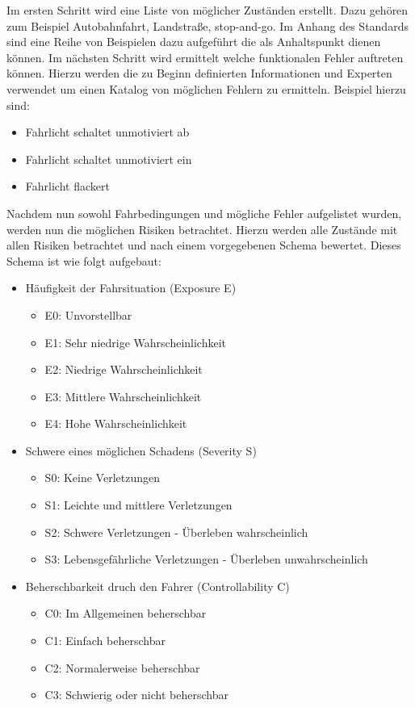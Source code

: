 \documentclass[a4paper,DIV=calc,ngerman]{scrartcl}
\begin{document}
Im ersten Schritt wird eine Liste von möglicher Zuständen erstellt. Dazu gehören zum Beispiel Autobahnfahrt, Landstraße, stop-and-go. Im Anhang des Standards sind eine Reihe von Beispielen dazu aufgeführt die als Anhaltspunkt dienen können. Im nächsten Schritt wird ermittelt welche funktionalen Fehler auftreten können. Hierzu werden die zu Beginn definierten Informationen und Experten verwendet um einen Katalog von möglichen Fehlern zu ermitteln. Beispiel hierzu sind:

\begin{itemize}
    \item Fahrlicht schaltet unmotiviert ab
    \item Fahrlicht schaltet unmotiviert ein
    \item Fahrlicht flackert
\end{itemize}

Nachdem nun sowohl Fahrbedingungen und mögliche Fehler aufgelistet wurden, werden nun die möglichen Risiken betrachtet. Hierzu werden alle Zustände mit allen Risiken betrachtet und nach einem vorgegebenen Schema bewertet. Dieses Schema ist wie folgt aufgebaut:

\begin{itemize}
    \item Häufigkeit der Fahrsituation (Exposure E)
    \begin{itemize}
        \item E0: Unvorstellbar
        \item E1: Sehr niedrige Wahrscheinlichkeit
        \item E2: Niedrige Wahrscheinlichkeit
        \item E3: Mittlere Wahrscheinlichkeit
        \item E4: Hohe Wahrscheinlichkeit
    \end{itemize}
    \item Schwere eines möglichen Schadens (Severity S)
    \begin{itemize}
        \item S0: Keine Verletzungen
        \item S1: Leichte und mittlere Verletzungen
        \item S2: Schwere Verletzungen - Überleben wahrscheinlich
        \item S3: Lebensgefährliche Verletzungen - Überleben unwahrscheinlich
    \end{itemize}
    \item Beherschbarkeit druch den Fahrer (Controllability C)
    \begin{itemize}
        \item C0: Im Allgemeinen beherschbar
        \item C1: Einfach beherschbar
        \item C2: Normalerweise beherschbar
        \item C3: Schwierig oder nicht beherschbar
    \end{itemize}
\end{itemize}
\end{document}
